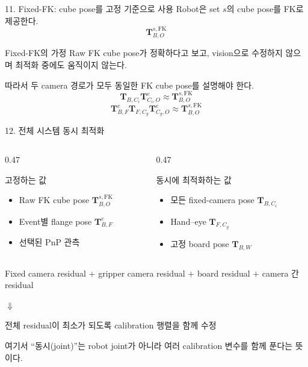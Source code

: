 \documentclass[aspectratio=169,11pt]{beamer}
\newcommand{\T}[2]{\mathbf T_{#1,#2}}
\begin{document}
\begin{frame}{11. Fixed-FK: cube pose를 고정 기준으로 사용}
  Robot은 set $s$의 cube pose를 FK로 제공한다.
  \[
    \boxed{\T{B}{O}^{s,\mathrm{FK}}}
  \]

  \begin{alertblock}{Fixed-FK의 가정}
    Raw FK cube pose가 정확하다고 보고, vision으로 수정하지 않으며 최적화 중에도 움직이지 않는다.
  \end{alertblock}

  따라서 두 camera 경로가 모두 동일한 FK cube pose를 설명해야 한다.
  \[
    \T{B}{C_i}\T{C_i}{O}^{e}
    \approx \T{B}{O}^{s,\mathrm{FK}}
  \]
  \[
    \T{B}{F}^{e}\T{F}{C_g}\T{C_g}{O}^{e}
    \approx \T{B}{O}^{s,\mathrm{FK}}
  \]
\end{frame}

\begin{frame}{12. 전체 시스템 동시 최적화}
  \begin{columns}[T]
    \begin{column}{0.47\textwidth}
      \begin{block}{고정하는 값}
        \begin{itemize}
          \item Raw FK cube pose $\T{B}{O}^{s,\mathrm{FK}}$
          \item Event별 flange pose $\T{B}{F}^{e}$
          \item 선택된 PnP 관측
        \end{itemize}
      \end{block}
    \end{column}
    \begin{column}{0.47\textwidth}
      \begin{block}{동시에 최적화하는 값}
        \begin{itemize}
          \item 모든 fixed-camera pose $\T{B}{C_i}$
          \item Hand--eye $\T{F}{C_g}$
          \item 고정 board pose $\T{B}{W}$
        \end{itemize}
      \end{block}
    \end{column}
  \end{columns}

  \vfill
  \begin{center}
    Fixed camera residual
    $+$ gripper camera residual
    $+$ board residual
    $+$ camera 간 residual

    \Large $\Downarrow$

    \normalsize 전체 residual이 최소가 되도록 calibration 행렬을 함께 수정
  \end{center}

  \vfill
  \small 여기서 ``동시(joint)''는 robot joint가 아니라 여러 calibration 변수를 함께 푼다는 뜻이다.
\end{frame}
\end{document}
